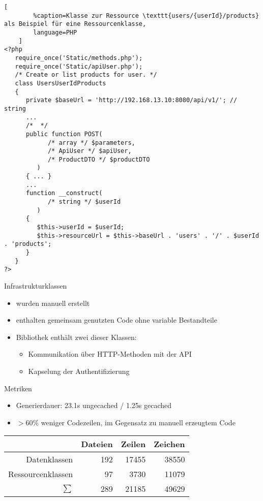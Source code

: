 \begin{frame}
    \begin{lstlisting}[
        %caption=Klasse zur Ressource \texttt{users/{userId}/products} als Beispiel für eine Ressourcenklasse,
        language=PHP
    ]
<?php
   require_once('Static/methods.php');
   require_once('Static/apiUser.php');
   /* Create or list products for user. */
   class UsersUserIdProducts
   {
      private $baseUrl = 'http://192.168.13.10:8080/api/v1/'; // string
      ...
      /*  */
      public function POST(
            /* array */ $parameters, 
            /* ApiUser */ $apiUser,
            /* ProductDTO */ $productDTO
         )
      { ... }
      ...
      function __construct(
            /* string */ $userId
         )
      {
         $this->userId = $userId;
         $this->resourceUrl = $this->baseUrl . 'users' . '/' . $userId . 'products';
      }
   }
?>
    \end{lstlisting}
\end{frame}

\begin{frame}{Infrastrukturklassen}
    \begin{itemize}
        \item wurden manuell erstellt
        \item enthalten gemeinsam genutzten Code ohne variable Bestandteile
        \item Bibliothek enthält zwei dieser Klassen:
        \begin{itemize}
            \item Kommunikation über HTTP-Methoden mit der API
            \item Kapselung der Authentifizierung
        \end{itemize}
    \end{itemize}
\end{frame}

\begin{frame}
  \begin{block}{Metriken}
    \begin{itemize}
      \item Generierdauer: 23.1s ungecached / 1.25s gecached
      \item $>60\%$ weniger Codezeilen, im Gegensatz zu manuell erzeugtem Code
    \end{itemize}
  \end{block}
  \begin{table}
    \begin{longtable}{r r r r}
      \toprule
      \rowcolor{lightgray}
                        & Dateien  & Zeilen    & Zeichen\\
      \midrule
      Datenklassen      & 192               & 17455               & 38550\\
      Ressourcenklassen & 97                & 3730                & 11079\\
      \midrule
      $\sum$            & 289               & 21185               & 49629\\
      \bottomrule
    \end{longtable} 
  \end{table}
\end{frame}